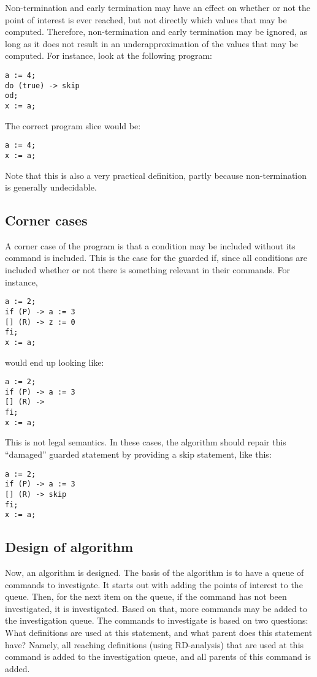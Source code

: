 Non-termination and early termination may have an effect on whether or not the point of interest is
ever reached, but not directly which values that may be computed. Therefore, non-termination and
early termination may be ignored, as long as it does not result in an underapproximation of the
values that may be computed. For instance, look at the following program:
\begin{lstlisting}
a := 4;
do (true) -> skip
od;
x := a;
\end{lstlisting}
The correct program slice would be:
\begin{lstlisting}
a := 4;
x := a;
\end{lstlisting}
Note that this is also a very practical definition, partly because non-termination is generally
undecidable.

\subsection{Corner cases}

A corner case of the program is that a condition may be included without its command is included.
This is the case for the guarded if, since all conditions are included whether or not there is
something relevant in their commands. For instance,
\begin{lstlisting}
a := 2;
if (P) -> a := 3
[] (R) -> z := 0
fi;
x := a;
\end{lstlisting}
would end up looking like:
\begin{lstlisting}
a := 2;
if (P) -> a := 3
[] (R) ->
fi;
x := a;
\end{lstlisting}
This is not legal semantics. In these cases, the algorithm should repair this “damaged” guarded
statement by providing a skip statement, like this:
\begin{lstlisting}
a := 2;
if (P) -> a := 3
[] (R) -> skip
fi;
x := a;
\end{lstlisting}

\subsection{Design of algorithm}

Now, an algorithm is designed. The basis of the algorithm is to have a queue of commands to
investigate. It starts out with adding the points of interest to the queue. Then, for the next
item on the queue, if the command has not been investigated, it is investigated. Based on that,
more commands may be added to the investigation queue. The commands to investigate is based
on two questions: What definitions are used at this statement, and what parent does this statement
have? Namely, all reaching definitions (using RD-analysis) that are used at this command is added
to the investigation queue, and all parents of this command is added.

